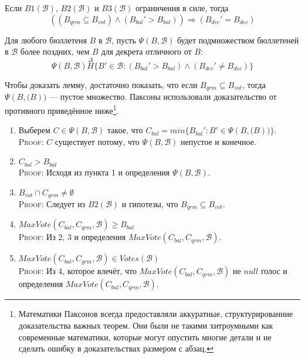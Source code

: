 \documentclass[12pt, a4paper]{article} %
\begin{document}
\begin{lemma}
Если $B1(\mathcal{B})$, $B2(\mathcal{B})$ и $B3(\mathcal{B})$ ограничения в силе, тогда
\[
    ((B_{qrm} \subseteq B_{vot}) \land (B_{bal}' > B_{bal})) \Rightarrow (B_{dec}' = B_{dec})
\]
\end{lemma}
\begin{lemmaproof}
Для любого бюллетеня $B$ в $\mathcal{B}$, пусть $\Psi(B, \mathcal{B})$ будет подмножеством бюллетеней в $\mathcal{B}$ более поздних, чем $B$ для декрета отличного от $B$:
\[
    \Psi(B, \mathcal{B}) \overset{\Delta}{H} \{B' \in \mathcal{B} : (B_{bal}' > B_{bal}) \land (B_{dec}' \neq B_{dec})\}
\]

Чтобы доказать лемму, достаточно показать, что если $B_{qrm} \subseteq B_{vot}$, тогда $\Psi(B, \mathcal(B))$ --- пустое множество. Паксоны использовали доказательство от противного приведённое ниже\footnote{Математики Паксонов всегда предоставляли аккуратные, структурированние доказательства важных теорем. Они были не такими хитроумными как современные математики, которые могут опустить многие детали и не сделать ошибку в доказательствах размером с абзац.}.
\begin{enumerate}
    \item Выберем $C \in \Psi(B, \mathcal{B})$ такое, что $C_{bal} = min \{B_{bal}' : B' \in \Psi(B, \mathcal(B))\}$. \\
          \textsc{Proof}: $C$ существует потому, что $\Psi(B, \mathcal{B})$ непустое и конечное.
    
    \item $C_{bal} > B_{bal}$\\
          \textsc{Proof}: Исходя из пункта 1 и определения $\Psi(B, \mathcal{B})$.

    \item $B_{vot} \cap C_{qrm} \neq \emptyset$\\
          \textsc{Proof}: Следует из  $B2(\mathcal{B})$ и гипотезы, что $B_{qrm} \subseteq B_{vot}$.
    
    \item $MaxVote(C_{bal}, C_{qrm}, \mathcal{B}) \geqslant B_{bal}$\\
          \textsc{Proof}: Из 2, 3 и определения $MaxVote(C_{bal}, C_{qrm}, \mathcal{B})$.

    \item $MaxVote(C_{bal}, C_{qrm}, \mathcal{B}) \in Votes(\mathcal{B})$\\
          \textsc{Proof}: Из 4, которое влечёт, что $MaxVote(C_{bal}, C_{qrm}, \mathcal{B})$ не $null$ голос и определения  $MaxVote(C_{bal}, C_{qrm}, \mathcal{B})$.


\end{enumerate}
\end{lemmaproof}
\end{document}
